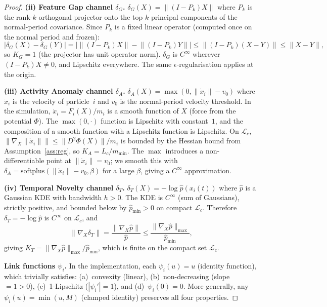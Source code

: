 \documentclass[final]{siamltex}
\newcommand{\norm}[1]{\lVert #1 \rVert}
\providecommand{\grad}{\nabla}
\begin{document}
\begin{appendix}
\begin{proof}
\medskip
\noindent\textbf{(ii) Feature Gap channel $\delta_G$.}
$\delta_G(X) = \norm{(I - P_k)X}$ where $P_k$ is the rank-$k$
orthogonal projector onto the top $k$ principal components of the
normal-period covariance.  Since $P_k$ is a fixed linear operator
(computed once on the normal period and frozen):
\[
  |\delta_G(X) - \delta_G(Y)|
  = |\norm{(I{-}P_k)X} - \norm{(I{-}P_k)Y}|
  \le \norm{(I{-}P_k)(X{-}Y)}
  \le \norm{X{-}Y},
\]
so $K_G = 1$ (the projector has unit operator norm).
$\delta_G$ is $C^\infty$ wherever $(I{-}P_k)X \neq 0$, and
Lipschitz everywhere.  The same $\epsilon$-regularisation applies
at the origin.

\medskip
\noindent\textbf{(iii) Activity Anomaly channel $\delta_A$.}
$\delta_A(X) = \max(0, \norm{\dot{x}_i} - v_0)$ where $\dot{x}_i$
is the velocity of particle~$i$ and $v_0$ is the normal-period
velocity threshold.  In the simulation, $\dot{x}_i = F_i(X)/m_i$
is a smooth function of $X$ (force from the potential $\Phi$).
The $\max(0,\cdot)$ function is Lipschitz with constant~$1$, and
the composition of a smooth function with a Lipschitz function is
Lipschitz.  On $\mathcal{L}_c$,
$\norm{\grad_X\norm{\dot{x}_i}} \le \norm{D^2\Phi(X)}/m_i$
is bounded by the Hessian bound from Assumption~\ref{ass:reg}, so
$K_A = L_c / m_{\min}$.  The $\max$ introduces a non-differentiable
point at $\norm{\dot{x}_i} = v_0$; we smooth this with
$\delta_A = \mathrm{softplus}(\norm{\dot{x}_i} - v_0, \beta)$
for a large $\beta$, giving a $C^\infty$ approximation.

\medskip
\noindent\textbf{(iv) Temporal Novelty channel $\delta_T$.}
$\delta_T(X) = -\log\hat{p}(x_i(t))$ where $\hat{p}$ is a
Gaussian KDE with bandwidth $h > 0$.  The KDE is $C^\infty$
(sum of Gaussians), strictly positive, and bounded below by
$\hat{p}_{\min} > 0$ on compact $\mathcal{L}_c$.  Therefore
$\delta_T = -\log\hat{p}$ is $C^\infty$ on $\mathcal{L}_c$, and
\[
  \norm{\grad_X\delta_T}
  = \frac{\norm{\grad_X\hat{p}}}{\hat{p}}
  \le \frac{\norm{\grad_X\hat{p}}_{\max}}{\hat{p}_{\min}},
\]
giving $K_T = \norm{\grad_X\hat{p}}_{\max}/\hat{p}_{\min}$,
which is finite on the compact set $\mathcal{L}_c$.

\medskip
\noindent\textbf{Link functions $\psi_i$.}
In the implementation, each $\psi_i(u) = u$ (identity function),
which trivially satisfies: (a)~convexity (linear), (b)~non-decreasing
(slope~$= 1 > 0$), (c)~1-Lipschitz ($|\psi_i'| = 1$), and
(d)~$\psi_i(0) = 0$.  More generally, any $\psi_i(u) = \min(u, M)$
(clamped identity) preserves all four properties.
\end{proof}


\end{appendix}
\end{document}
